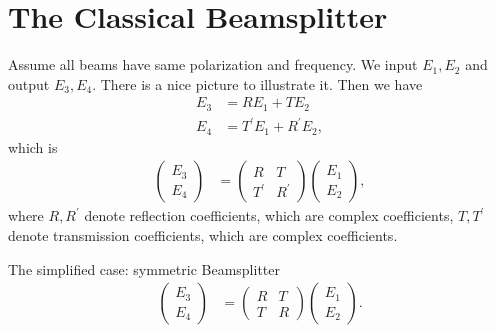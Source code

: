 \documentclass[../../note.tex]{subfiles}
\begin{document}
\section{The Classical Beamsplitter}
Assume all beams have same polarization and frequency. We input $E_1, E_2$ and output $E_3, E_4$. There is a nice picture to illustrate it. Then we have
\begin{align}
    E_3 
    &= R E_1 + T E_2 \\
    E_4 
    &= T^\prime E_1 + R^\prime E_2,
\end{align}
which is 
\begin{align}
    \left(\begin{matrix}
        E_3 \\
        E_4
    \end{matrix}\right)
    &=  \left(\begin{matrix}
        R & T \\
        T^\prime & R^\prime 
    \end{matrix}\right) 
    \left(\begin{matrix}
        E_1 \\
        E_2
    \end{matrix}\right),
\end{align}
where $R, R^\prime$ denote reflection coefficients, which are complex coefficients, $T, T^\prime$ denote transmission coefficients, which are complex coefficients. 

The simplified case: symmetric Beamsplitter
\begin{align}
    \label{eq: classical beam splitter}
    \left(\begin{matrix}
        E_3 \\
        E_4
    \end{matrix}\right)
    &=  \left(\begin{matrix}
        R & T \\
        T & R 
    \end{matrix}\right) 
    \left(\begin{matrix}
        E_1 \\
        E_2
    \end{matrix}\right).
\end{align}
\end{document}
